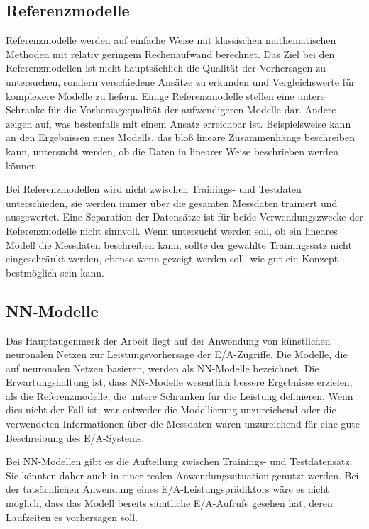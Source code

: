 \documentclass[
	12pt,
	a4paper,
	BCOR10mm,
	DIV14,
	listof=totoc,
	bibliography=totoc,
	headsepline
]{scrreprt}
\begin{document}
\subsection{Referenzmodelle}
Referenzmodelle werden auf einfache Weise mit klassischen mathematischen Methoden mit relativ geringem Rechenaufwand berechnet.
Das Ziel bei den Referenzmodellen ist nicht hauptsächlich die Qualität der Vorhersagen zu untersuchen, sondern verschiedene Ansätze zu erkunden und Vergleichswerte für komplexere Modelle zu liefern.
Einige Referenzmodelle stellen eine untere Schranke für die Vorhersagequalität der aufwendigeren Modelle dar. Andere zeigen auf, was bestenfalls mit einem Ansatz erreichbar ist.
Beispielsweise kann an den Ergebnissen eines Modells, das bloß lineare Zusammenhänge beschreiben kann, untersucht werden, ob die Daten in linearer Weise beschrieben werden können.\medskip

Bei Referenzmodellen wird nicht zwischen Trainings- und Testdaten unterschieden, sie werden immer über die gesamten Messdaten trainiert und ausgewertet.
Eine Separation der Datensätze ist für beide Verwendungszwecke der Referenzmodelle nicht sinnvoll. 
Wenn untersucht werden soll, ob ein lineares Modell die Messdaten beschreiben kann, sollte der gewählte Trainingssatz nicht eingeschränkt werden, ebenso wenn gezeigt werden soll, wie gut ein Konzept bestmöglich sein kann.

\subsection{NN-Modelle}
Das Hauptaugenmerk der Arbeit liegt auf der Anwendung von künstlichen neuronalen Netzen zur Leistungsvorhersage der E/A-Zugriffe. Die Modelle, die auf neuronalen Netzen basieren, werden als NN-Modelle bezeichnet.
Die Erwartungshaltung ist, dass NN-Modelle wesentlich bessere Ergebnisse erzielen, als die Referenzmodelle, die untere Schranken für die Leistung definieren.
Wenn dies nicht der Fall ist, war entweder die Modellierung unzureichend oder die verwendeten Informationen über die Messdaten waren unzureichend für eine gute Beschreibung des E/A-Systems.\medskip

Bei NN-Modellen gibt es die Aufteilung zwischen Trainings- und Testdatensatz.
Sie könnten daher auch in einer realen Anwendungssituation genutzt werden. 
Bei der tatsächlichen Anwendung eines E/A-Leistungsprädiktors wäre es nicht möglich, dass das Modell bereits sämtliche E/A-Aufrufe gesehen hat, deren Laufzeiten es vorhersagen soll.
\end{document}
